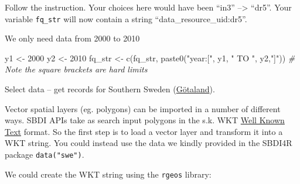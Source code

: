 \documentclass[
  10pt,
]{article}
\newenvironment{Shaded}{\begin{snugshade}}{\end{snugshade}}
\newcommand{\CommentTok}[1]{\textcolor[rgb]{0.56,0.35,0.01}{\textit{#1}}}
\newcommand{\DecValTok}[1]{\textcolor[rgb]{0.00,0.00,0.81}{#1}}
\newcommand{\FunctionTok}[1]{\textcolor[rgb]{0.00,0.00,0.00}{#1}}
\newcommand{\NormalTok}[1]{#1}
\newcommand{\OtherTok}[1]{\textcolor[rgb]{0.56,0.35,0.01}{#1}}
\newcommand{\SpecialCharTok}[1]{\textcolor[rgb]{0.00,0.00,0.00}{#1}}
\newcommand{\StringTok}[1]{\textcolor[rgb]{0.31,0.60,0.02}{#1}}
\begin{document}
Follow the instruction. Your choices here would have been ``in3'' --\textgreater{} ``dr5''.
Your variable \texttt{fq\_str} will now contain a string ``data\_resource\_uid:dr5''.

We only need data from 2000 to 2010

\begin{Shaded}
\begin{Highlighting}[]
\NormalTok{y1 }\OtherTok{\textless{}{-}} \DecValTok{2000}
\NormalTok{y2 }\OtherTok{\textless{}{-}} \DecValTok{2010}
\NormalTok{fq\_str }\OtherTok{\textless{}{-}} \FunctionTok{c}\NormalTok{(fq\_str, }\FunctionTok{paste0}\NormalTok{(}\StringTok{"year:["}\NormalTok{, y1, }\StringTok{" TO "}\NormalTok{, y2,}\StringTok{"]"}\NormalTok{))}
\CommentTok{\# Note the square brackets are hard limits}
\end{Highlighting}
\end{Shaded}

Select data -- get records for Southern Sweden (\href{https://en.wikipedia.org/wiki/G\%C3\%B6taland}{Götaland}).

Vector spatial layers (eg. polygons) can be imported in a number of different ways.
SBDI APIs take as search input polygons in the s.k. WKT \href{https://www.geoapi.org/3.0/javadoc/org/opengis/referencing/doc-files/WKT.html}{Well Known Text}
format. So the first step is to load a vector layer and transform it into a WKT string.
You could instead use the data we kindly provided in the SBDI4R package \texttt{data("swe")}.

\begin{Shaded}
\end{Shaded}

We could create the WKT string using the \texttt{rgeos} library:
\end{document}
